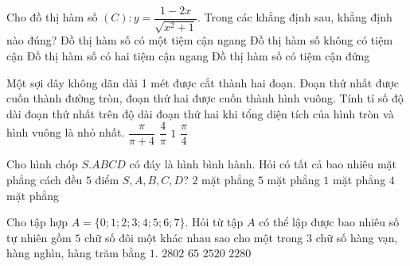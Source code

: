 \begin{ex}%
Cho đồ thị hàm số $(C):y=\dfrac{1-2x}{\sqrt{x^2+1}}$. Trong các khẳng định sau, khẳng định nào đúng?
\choice
{Đồ thị hàm số có một tiệm cận ngang}
{Đồ thị hàm số không có tiệm cận}
{\True Đồ thị hàm số có hai tiệm cận ngang}
{Đồ thị hàm số có tiệm cận đứng}
\end{ex}

\begin{ex}%
Một sợi dây không dãn dài 1 mét được cắt thành hai đoạn. Đoạn thứ nhất được cuốn thành đường tròn, đoạn thứ hai được cuốn thành hình vuông. Tính tỉ số độ dài đoạn thứ nhất trên độ dài đoạn thứ hai khi tổng diện tích của hình tròn và hình vuông là nhỏ nhất.
\choice
{$\dfrac{\pi}{\pi +4}$}
{$\dfrac{4}{\pi}$}
{$1$}
{\True $\dfrac{\pi}{4}$}
\end{ex}

\begin{ex}%
Cho hình chóp $S.ABCD$ có đáy là hình bình hành. Hỏi có tất cả bao nhiêu mặt phẳng cách đều $5$ điểm $S,A,B,C,D$?
\choice
{$2$ mặt phẳng}
{\True $5$ mặt phẳng}
{$1$ mặt phẳng}
{$4$ mặt phẳng}
\end{ex}

\begin{ex}%
Cho tập hợp $A = \{ 0;1;2;3;4;5;6;7\}$. Hỏi từ tập $A$ có thể lập được bao nhiêu số tự nhiên gồm $5$ chữ số đôi một khác nhau sao cho một trong $3$ chữ số hàng vạn, hàng nghìn, hàng trăm bằng $1$.
\choice
{$2802$}
{$65$}
{$2520$}
{\True $2280$}
\end{ex}

